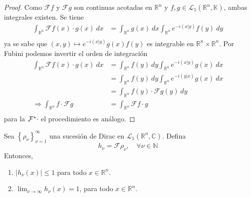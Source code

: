 \documentclass[12pt]{report}
\theoremstyle{largebreak}
\renewcommand{\leq}{\ensuremath{\leqslant}}
\newcommand\abs[1]{\ensuremath{\left|#1\right|}}
\newcommand\pint[2]{\ensuremath{\left(#1\big| #2\right)}}
\newcommand{\fou}[1]{\ensuremath{\mathcal{F}#1}}
\begin{document}
    \begin{proof}
        Como $\fou{f}$ y $\fou{g}$ son continuas acotadas en $\mathbb{R}^n$ y $f,g\in\mathcal{L}_1(\mathbb{R}^n,\mathbb{K})$, ambas integrales existen. Se tiene
        \begin{equation*}
            \begin{split}
                \int_{\mathbb{R}^n}\fou{f}(x)\cdot g(x)\:dx&=\int_{\mathbb{R}^n}g(x)\:dx\int_{\mathbb{R}^n}e^{ -i\pint{x}{y}}f(y)\:dy\\
            \end{split}
        \end{equation*}
        ya se sabe que $(x,y)\mapsto e^{ -i\pint{x}{y}}g(x)f(y)$ es integrable en $\mathbb{R}^n\times\mathbb{R}^n$. Por Fubini podemos invertir el orden de integración
        \begin{equation*}
            \begin{split}
                \int_{\mathbb{R}^n}\fou{f}(x)\cdot g(x)\:dx&=\int_{\mathbb{R}^n}f(y)\:dy\int_{\mathbb{R}^n}e^{ -i\pint{x}{y}}g(x)\:dx\\
                &=\int_{\mathbb{R}^n}f(y)\:dy\int_{\mathbb{R}^n}e^{ -i\pint{y}{x}}g(x)\:dx\\
                &=\int_{\mathbb{R}^n}f(y)\cdot\fou{g}(y)\:dy\\
                \Rightarrow \int_{\mathbb{R}^n}f\cdot\fou{g}&=\int_{\mathbb{R}^n}\fou{f}\cdot g\\
            \end{split}
        \end{equation*}
        para la $\fou^*{\cdot}$ el procedimiento es análogo.
    \end{proof}

    \begin{lema}
        Sea $\left\{\rho_\nu \right\}_{\nu=1}^\infty$ una sucesión de Dirac en $\mathcal{L}_1(\mathbb{R}^n,\mathbb{C})$. Defina
        \begin{equation*}
            h_\nu=\fou{\rho_\nu},\quad\forall\nu\in\mathbb{N}
        \end{equation*}
        Entonces,
        \begin{enumerate}
            \item $\abs{h_\nu(x)}\leq1$ para todo $x\in\mathbb{R}^n$.
            \item $\lim_{\nu\rightarrow\infty}h_\nu(x)=1$, para todo $x\in\mathbb{R}^n$.
        \end{enumerate}
    \end{lema}
\end{document}
